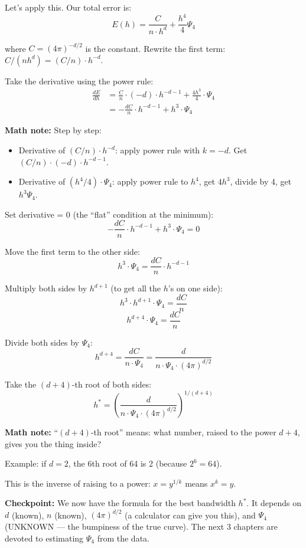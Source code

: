 \documentclass[12pt]{article}
\newcommand{\mathnote}[1]{\begin{tcolorbox}[colback=yellow!5,colframe=yellow!60!black,breakable]\textbf{Math note:} #1\end{tcolorbox}}
\newcommand{\checkpoint}[1]{\begin{tcolorbox}[colback=purple!5,colframe=purple!50!black,breakable]\textbf{Checkpoint:} #1\end{tcolorbox}}
\begin{document}
Let's apply this. Our total error is:
$$E(h) = \frac{C}{n \cdot h^d} + \frac{h^4}{4}\Psi_4$$

where $C = (4\pi)^{-d/2}$ is the constant. Rewrite the first term: $C/(n h^d) = (C/n) \cdot h^{-d}$.

Take the derivative using the power rule:
\begin{align*}
\frac{dE}{dh} &= \frac{C}{n} \cdot (-d) \cdot h^{-d-1} + \frac{4h^3}{4} \cdot \Psi_4 \\[6pt]
&= -\frac{dC}{n} \cdot h^{-d-1} + h^3 \cdot \Psi_4
\end{align*}

\mathnote{
Step by step:
\begin{itemize}
\item Derivative of $(C/n) \cdot h^{-d}$: apply power rule with $k = -d$. Get $(C/n)\cdot(-d)\cdot h^{-d-1}$.
\item Derivative of $(h^4/4)\cdot\Psi_4$: apply power rule to $h^4$, get $4h^3$, divide by 4, get $h^3\Psi_4$.
\end{itemize}
}

Set derivative = 0 (the ``flat'' condition at the minimum):
$$-\frac{dC}{n} \cdot h^{-d-1} + h^3 \cdot \Psi_4 = 0$$

Move the first term to the other side:
$$h^3 \cdot \Psi_4 = \frac{dC}{n} \cdot h^{-d-1}$$

Multiply both sides by $h^{d+1}$ (to get all the $h$'s on one side):
$$h^3 \cdot h^{d+1} \cdot \Psi_4 = \frac{dC}{n}$$
$$h^{d+4} \cdot \Psi_4 = \frac{dC}{n}$$

Divide both sides by $\Psi_4$:
$$h^{d+4} = \frac{dC}{n \cdot \Psi_4} = \frac{d}{n \cdot \Psi_4 \cdot (4\pi)^{d/2}}$$

Take the $(d+4)$-th root of both sides:
$$\boxed{h^* = \left(\frac{d}{n \cdot \Psi_4 \cdot (4\pi)^{d/2}}\right)^{\!1/(d+4)}}$$

\mathnote{
``$(d+4)$-th root'' means: what number, raised to the power $d+4$, gives you the thing inside?

Example: if $d=2$, the 6th root of 64 is 2 (because $2^6 = 64$).

This is the inverse of raising to a power: $x = y^{1/k}$ means $x^k = y$.
}

\checkpoint{We now have the formula for the best bandwidth $h^*$. It depends on $d$ (known), $n$ (known), $(4\pi)^{d/2}$ (a calculator can give you this), and $\Psi_4$ (UNKNOWN --- the bumpiness of the true curve). The next 3 chapters are devoted to estimating $\Psi_4$ from the data.}
\end{document}
